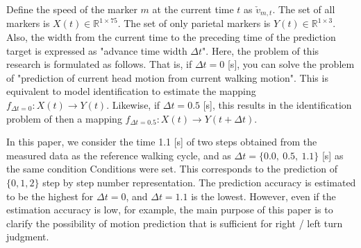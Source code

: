 \documentclass{sigchi}
\begin{document}
Define the speed of the marker $m$ at the current time $t$ as $\check{v}_{m, t}$. The set of all markers is $X(t)\in\mathbb{R}^{1 \times 75} $. The set of only parietal markers is $ Y(t)\in\mathbb {R}^{1\times 3}$. Also, the width from the current time to the preceding time of the prediction target is expressed as "advance time width $\Delta t$". Here, the problem of this research is formulated as follows. That is, if $\Delta t = 0$ [s], you can solve the problem of "prediction of current head motion from current walking motion". This is equivalent to model identification to estimate the mapping $ f_ {\Delta t = 0}: X (t) \rightarrow Y (t) $. Likewise, if $ \Delta t = 0.5 $ [s], this results in the identification problem of then a mapping $ f_ {\Delta t = 0.5}: X (t) \rightarrow Y (t + \Delta t) $.

In this paper, we consider the time 1.1 [s] of two steps obtained from the measured data as the reference walking cycle, and as $ \Delta t = \{0.0, \ 0.5, \ 1.1 \} $ [s] as the same condition Conditions were set. This corresponds to the prediction of $ \{0, 1, 2\} $ step by step number representation. The prediction accuracy is estimated to be the highest for $ \Delta t = 0 $, and $ \Delta t = 1.1 $ is the lowest. However, even if the estimation accuracy is low, for example, the main purpose of this paper is to clarify the possibility of motion prediction that is sufficient for right / left turn judgment.
\end{document}
